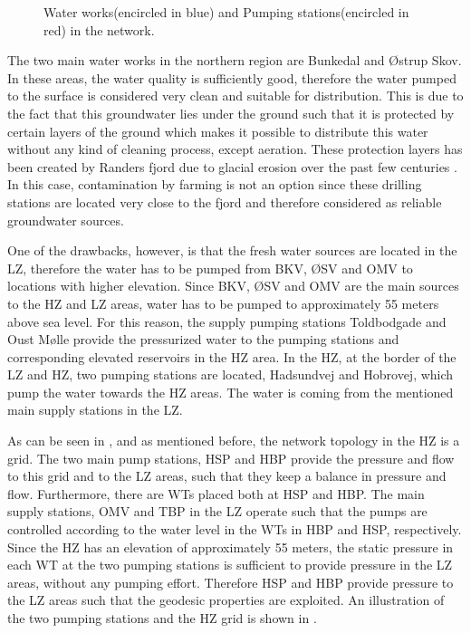 \begin{figure}[H]
\centering
 
\caption{Water works(encircled in blue) and Pumping stations(encircled in red) in the network.}
\vspace{-3mm}
\label{fig:pumping_stations_and_waterworks}
\end{figure}

The two main water works in the northern region are Bunkedal and Østrup Skov. In these areas, the water quality is sufficiently good, therefore the water pumped to the surface is considered very clean and suitable for distribution. This is due to the fact that this groundwater lies under the ground such that it is protected by certain layers of the ground which makes it possible to distribute this water without any kind of cleaning process, except aeration. These protection layers has been created by Randers fjord due to glacial erosion over the past few centuries \cite{geological1909water}. In this case, contamination by farming is not an option since these drilling stations are located very close to the fjord and therefore considered as reliable groundwater sources. 

One of the drawbacks, however, is that the fresh water sources are located in the LZ, therefore the water has to be pumped from BKV, ØSV and OMV to locations with higher elevation. Since BKV, ØSV and OMV are the main sources to the HZ and LZ areas, water has to be pumped to approximately 55 meters above sea level. For this reason, the supply pumping stations Toldbodgade and Oust Mølle provide the pressurized water to the pumping stations and corresponding elevated reservoirs in the HZ area. In the HZ, at the border of the LZ and HZ, two pumping stations are located, Hadsundvej and Hobrovej, which pump the water towards the HZ areas. The water is coming from the mentioned main supply stations in the LZ. 

As can be seen in , and as mentioned before, the network topology in the HZ is a grid. The two main pump stations, HSP and HBP provide the pressure and flow to this grid and to the LZ areas, such that they keep a balance in pressure and flow. Furthermore, there are WTs placed both at HSP and HBP. The main supply stations, OMV and TBP in the LZ operate such that the pumps are controlled according to the water level in the WTs in HBP and HSP, respectively. Since the HZ has an elevation of approximately 55 meters, the static pressure in each WT at the two pumping stations is sufficient to provide pressure in the LZ areas, without any pumping effort. Therefore HSP and HBP provide pressure to the LZ areas such that the geodesic properties are exploited. An illustration of the two pumping stations and the HZ grid is shown in . 

